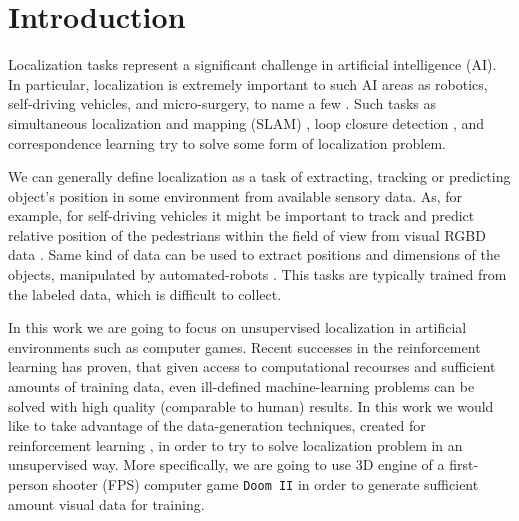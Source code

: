 
\chapter{Introduction}
\label{ch:intro}

%
%
%

Localization tasks represent a significant challenge in artificial intelligence (AI).
In particular, localization is extremely important to such AI areas as robotics, self-driving vehicles, and micro-surgery, to name a few \cite{Wang2017, Mountney2006}.
Such tasks as simultaneous localization and mapping (SLAM) \cite{Cadena2015, Zikos2016}, loop closure detection \cite{Xia2016, Gao2015a, Huang2016}, and correspondence learning \cite{Boscaini2016} try to solve some form of localization problem.

We can generally define localization as a task of extracting, tracking or predicting object's position in some environment from available sensory data. As, for example, for self-driving vehicles it might be important to track and predict relative position of the pedestrians within the field of view from visual RGBD data \cite{Dollar2009}. Same kind of data can be used to extract positions and dimensions of the objects, manipulated by automated-robots \cite{Hernandez2016}. This tasks are typically trained from the labeled data, which is difficult to collect.

In this work we are going to focus on unsupervised localization in artificial environments such as computer games. Recent successes in the reinforcement learning \cite{Silver, Lample2016} has proven, that given access to computational recourses and sufficient amounts of training data, even ill-defined machine-learning problems can be solved with high quality (comparable to human) results. In this work we would like to take advantage of the data-generation techniques, created for reinforcement learning \cite{Brockman2016, Kempka2016}, in order to try to solve localization problem in an unsupervised way. More specifically, we are going to use 3D engine of a first-person shooter (FPS) computer game \texttt{Doom II} in order to generate sufficient amount visual data for training.


